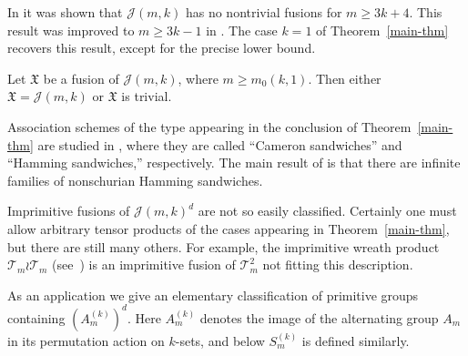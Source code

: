 \documentclass[ALCO]{cedram}
\newcommand{\cJ}{{\mathcal J}}
\def\X{\mathfrak{X}}
\def\T{\mathcal{T}}
\begin{document}
In \cite{M-johnson} it was shown that $\cJ(m, k)$ has no nontrivial fusions for $m \geq 3k+4$.
{This result was improved  to $m\geq 3k-1$ in \cite{U}.}
The case $k = 1$ of Theorem~\ref{main-thm} recovers this result, except for the precise lower bound.

\begin{cor}
    Let $\X$ be a fusion of $\cJ(m, k)$, where $m \geq m_0(k,1)$. Then either $\X = \cJ(m, k)$ or $\X$ is trivial.
\end{cor}

Association schemes of the type appearing in the conclusion of Theorem~\ref{main-thm} are studied in \cite{E}, where they are called ``Cameron sandwiches'' and ``Hamming sandwiches,'' respectively.
The main result of \cite{E} is that there are infinite families of nonschurian Hamming sandwiches.


\begin{remark}
Imprimitive fusions of $\cJ(m, k)^d$ are not so easily classified.
Certainly one must allow arbitrary tensor products of the cases appearing in Theorem~\ref{main-thm}, but there are still many others.
For example, the imprimitive wreath product $\T_m \wr \T_m$ (see~\cite[Section~3.4.1]{CP}) is an imprimitive fusion of $\T_m^2$ not fitting this description.
\end{remark}

As an application we give an elementary classification of primitive groups containing $(A_m^{(k)})^d$.
Here $A_m^{(k)}$ denotes the image of the alternating group $A_m$ in its permutation action on $k$-sets,
and below $S_m^{(k)}$ is defined similarly.
\end{document}
